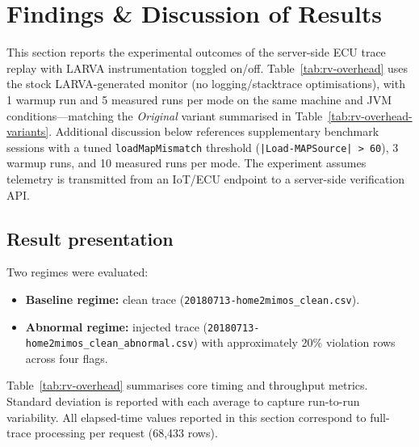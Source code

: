 \section{Findings \& Discussion of Results}
\label{sec:Fin}

This section reports the experimental outcomes of the server-side ECU trace replay with LARVA instrumentation toggled on/off. Table~\ref{tab:rv-overhead} uses the stock LARVA-generated monitor (no logging/stacktrace optimisations), with 1 warmup run and 5 measured runs per mode on the same machine and JVM conditions---matching the \emph{Original} variant summarised in Table~\ref{tab:rv-overhead-variants}. Additional discussion below references supplementary benchmark sessions with a tuned \texttt{loadMapMismatch} threshold (\texttt{|Load-MAPSource| > 60}), 3 warmup runs, and 10 measured runs per mode. The experiment assumes telemetry is transmitted from an IoT/ECU endpoint to a server-side verification API.

\subsection{Result presentation}

Two regimes were evaluated:
\begin{itemize}
    \item \textbf{Baseline regime:} clean trace (\texttt{20180713-home2mimos\_clean.csv}).
    \item \textbf{Abnormal regime:} injected trace (\texttt{20180713-home2mimos\_clean\_abnormal.csv}) with approximately 20\% violation rows across four flags.
\end{itemize}

Table~\ref{tab:rv-overhead} summarises core timing and throughput metrics. Standard deviation is reported with each average to capture run-to-run variability.
All elapsed-time values reported in this section correspond to full-trace processing per request (68{,}433 rows).

